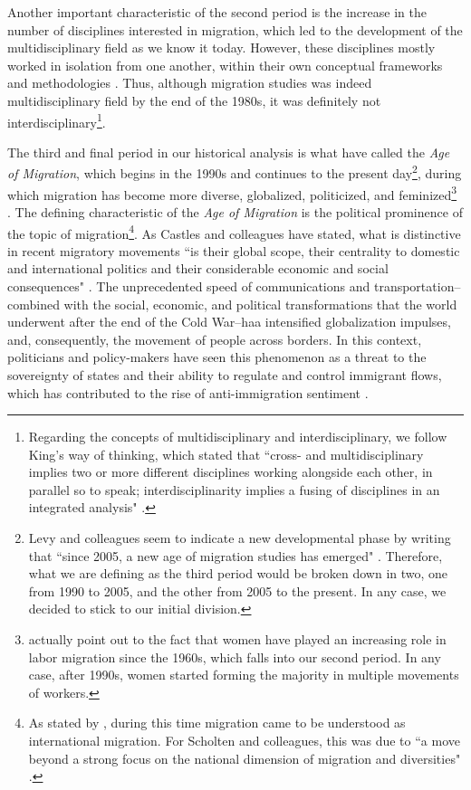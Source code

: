 Another important characteristic of the second period is the increase in the number of disciplines interested in migration, which led to the development of the multidisciplinary field as we know it today. However, these disciplines mostly worked in isolation from one another, within their own conceptual frameworks and methodologies \citep{levy_between_2020, scholten_introduction_2022}. Thus, although migration studies was indeed multidisciplinary field by the end of the 1980s, it was definitely not interdisciplinary\footnote{Regarding the concepts of multidisciplinary and interdisciplinary, we follow King's way of thinking, which stated that ``cross- and multidisciplinary implies two or more different disciplines working alongside each other, in parallel so to speak; interdisciplinarity implies a fusing of disciplines in an integrated analysis" \citep[p. 10]{king_theories_2012}.}.

The third and final period in our historical analysis is what \cite{castles_migration_2014} have called the \textit{Age of Migration}, which begins in the 1990s and continues to the present day\footnote{Levy and colleagues seem to indicate a new developmental phase by writing that ``since 2005, a new age of migration studies has emerged" \citep[p. 17]{levy_between_2020}. Therefore, what we are defining as the third period would be broken down in two, one from 1990 to 2005, and the other from 2005 to the present. In any case, we decided to stick to our initial division.}, during which migration has become more diverse, globalized, politicized, and feminized\footnote{\cite{castles_migration_2014} actually point out to the fact that women have played an increasing role in labor migration since the 1960s, which falls into our second period. In any case, after 1990s, women started forming the majority in multiple movements of workers.} \citep{king_theories_2012, castles_migration_2014}. The defining characteristic of the \textit{Age of Migration} is the political prominence of the topic of migration\footnote{As stated by \cite{king_mind_2010}, during this time migration came to be understood as international migration. For Scholten and colleagues, this was due to ``a move beyond a strong focus on the national dimension of migration and diversities" \citep[p. 16]{scholten_introduction_2022}.}. As Castles and colleagues have stated, what is distinctive in recent migratory movements ``is their global scope, their centrality to domestic and international politics and their considerable economic and social consequences" \citep[p. 6]{castles_migration_2014}. The unprecedented speed of communications and transportation--combined with the social, economic, and political transformations that the world underwent after the end of the Cold War--haa intensified globalization impulses, and, consequently, the movement of people across borders. In this context, politicians and policy-makers have seen this phenomenon as a threat to the sovereignty of states and their ability to regulate and control immigrant flows, which has contributed to the rise of anti-immigration sentiment \citep{martiniello_introduction_2012, castles_migration_2014}.

